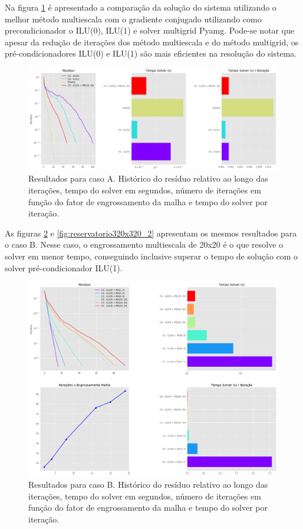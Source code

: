 Na figura \ref{fig:reservatorio100x100_2} é apresentado a comparação da solução do sistema utilizando o melhor método multiescala com o gradiente conjugado utilizando como precondicionador o ILU(0), ILU(1) e solver multigrid Pyamg. Pode-se notar que apesar da redução de iterações dos método multiescala e do método multigrid, os pré-condicionadores ILU(0) e ILU(1) são mais eficientes na resolução do sistema. 


\begin{figure}[!htbp]
\label{fig:reservatorio100x100_2}
\centering
\includegraphics[width=\textwidth]{chap08/figs/reservatorio100x100_2.png}
\caption{Resultados para caso A. Histórico do resíduo relativo ao longo das iterações, tempo do solver em segundos, número de iterações em função do fator de engrossamento da malha e tempo do solver por iteração. }
\end{figure}


As figuras \ref{fig:reservatorio320x320_1} e \ref{fig:reservatorio320x320_2} apresentam os mesmos resultados para o caso B. Nesse caso, o engrossamento multiescala de 20x20 é o que resolve o solver em menor tempo, conseguindo inclusive superar o tempo de solução com o solver pré-condicionador ILU(1).


\begin{figure}[!htbp]
\label{fig:reservatorio320x320_1}
\centering
\includegraphics[width=\textwidth]{chap08/figs/reservatorio320x320_1.png}
\caption{Resultados para caso B. Histórico do resíduo relativo ao longo das iterações, tempo do solver em segundos, número de iterações em função do fator de engrossamento da malha e tempo do solver por iteração. }
\end{figure}


